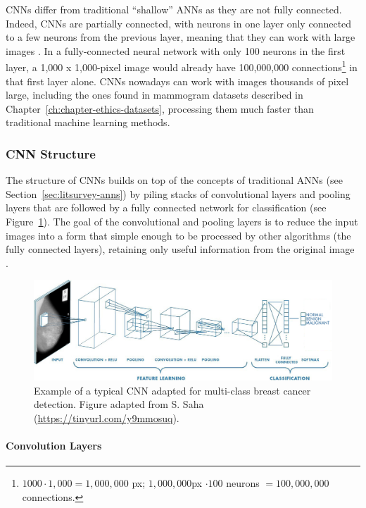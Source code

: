 CNNs differ from traditional ``shallow'' ANNs as they are not fully connected. Indeed, CNNs are partially connected, with neurons in one layer only connected to a few neurons from the previous layer, meaning that they can work with large images \citep{Geron2019}. In a fully-connected neural network with only 100 neurons in the first layer, a 1,000 x 1,000-pixel image would already have 100,000,000 connections\footnote{$1000 \cdot 1,000 = 1,000,000$ px; $1,000,000$px $\cdot 100$ neurons $= 100,000,000$ connections.} in that first layer alone. CNNs nowadays can work with images thousands of pixel large, including the ones found in mammogram datasets described in Chapter~\ref{ch:chapter-ethics-datasets}, processing them much faster than traditional machine learning methods.

\subsubsection{CNN Structure}

The structure of CNNs builds on top of the concepts of traditional ANNs (see Section~\ref{sec:litsurvey-anns}) by piling stacks of convolutional layers and pooling layers that are followed by a fully connected network for classification (see Figure~\ref{fig:litsurvey-CNN-example}). The goal of the convolutional and pooling layers is to reduce the input images into a form that simple enough to be processed by other algorithms (the fully connected layers), retaining only useful information from the original image \citep{Shen2017}.

\begin{figure}[ht]
\centerline{\includegraphics[width=\textwidth]{figures/litsurvey/CNN example.png}}
\caption{\label{fig:litsurvey-CNN-example}Example of a typical CNN adapted for multi-class breast cancer detection. Figure adapted from S. Saha (\url{https://tinyurl.com/y9mmosuq}).}
\end{figure}

\paragraph{Convolution Layers}

